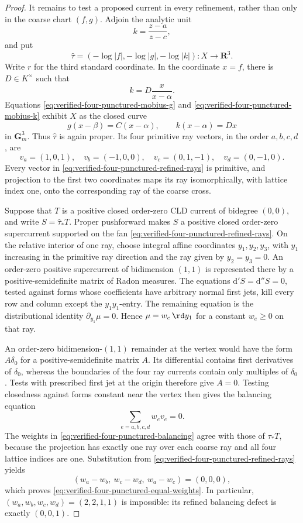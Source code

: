 \begin{proof}
It remains to test a proposed current in every refinement, rather than only
in the coarse chart \((f,g)\).  Adjoin the analytic unit
\[
                         k=\frac{z-a}{z-c},
\]
and put
\[
 \widehat\tau=(-\log|f|,-\log|g|,-\log|k|):X\longrightarrow\mathbf R^3.
\]
Write \(r\) for the third standard coordinate.  In the coordinate \(x=f\),
there is
\(D\in K^\times\) such that
\[
                         k=D\frac{x}{x-\alpha}.
\tag{69.13p}\label{eq:verified-four-punctured-mobius-k}
\]
Equations \eqref{eq:verified-four-punctured-mobius-g} and
\eqref{eq:verified-four-punctured-mobius-k} exhibit \(X\) as the closed curve
\[
 g(x-\beta)=C(x-\alpha),\qquad k(x-\alpha)=Dx
\]
in \(\mathbf G_m^3\).  Thus \(\widehat\tau\) is again proper.  Its four
primitive ray vectors, in the order \(a,b,c,d\), are
\[
 v_a=(1,0,1),\quad v_b=(-1,0,0),\quad
 v_c=(0,1,-1),\quad v_d=(0,-1,0).
\tag{69.13q}\label{eq:verified-four-punctured-refined-rays}
\]
Every vector in \eqref{eq:verified-four-punctured-refined-rays} is primitive,
and projection to the first two coordinates maps its ray isomorphically,
with lattice index one, onto the corresponding ray of the coarse cross.

Suppose that \(T\) is a positive closed order-zero CLD current of bidegree
\((0,0)\), and write \(S=\widehat\tau_*T\).  Proper pushforward makes \(S\)
a positive closed order-zero supercurrent supported on the fan
\eqref{eq:verified-four-punctured-refined-rays}.  On the relative interior
of one ray, choose integral affine coordinates \(y_1,y_2,y_3\), with
\(y_1\) increasing in the primitive ray direction and the ray given by
\(y_2=y_3=0\).  An order-zero positive supercurrent of bidimension
\((1,1)\) is represented there by a positive-semidefinite matrix of Radon
measures.  The equations \(\mathrm d' S=\mathrm d'' S=0\), tested against
forms whose coefficients have arbitrary normal first jets, kill every row
and column except the \(y_1y_1\)-entry.  The remaining equation is the
distributional identity \(\partial_{y_1}\mu=0\).  Hence
\(\mu=w_e\,\rd y_1\) for a constant \(w_e\geq0\) on that ray.

An order-zero bidimension-\((1,1)\) remainder at the vertex would have the
form \(A\delta_0\) for a positive-semidefinite matrix \(A\).  Its
differential contains first derivatives of \(\delta_0\), whereas the
boundaries of the four ray currents contain only multiples of \(\delta_0\).
Tests with prescribed first jet at the origin therefore give \(A=0\).
Testing closedness against forms constant near the vertex then gives the
balancing equation
\[
                         \sum_{e=a,b,c,d}w_ev_e=0.
\tag{69.13r}\label{eq:verified-four-punctured-balancing}
\]
The weights in \eqref{eq:verified-four-punctured-balancing} agree with those
of \(\tau_*T\), because the projection has exactly one ray over each coarse
ray and all four lattice indices are one.  Substitution from
\eqref{eq:verified-four-punctured-refined-rays} yields
\[
 (w_a-w_b,\ w_c-w_d,\ w_a-w_c)=(0,0,0),
\]
which proves \eqref{eq:verified-four-punctured-equal-weights}.  In
particular, \((w_a,w_b,w_c,w_d)=(2,2,1,1)\) is impossible: its refined
balancing defect is exactly \((0,0,1)\).


\end{proof}
